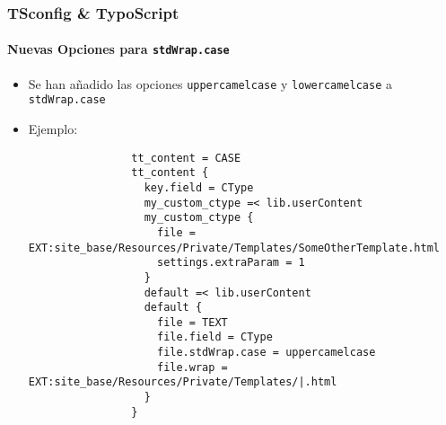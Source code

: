 
\begin{frame}[fragile]
	\frametitle{TSconfig \& TypoScript}
	\framesubtitle{Nuevas Opciones para \texttt{stdWrap.case}}

	\lstset{basicstyle=\tiny\ttfamily}

	\begin{itemize}

		\item Se han añadido las opciones \texttt{uppercamelcase} y \texttt{lowercamelcase}
			a \texttt{stdWrap.case}

		\item Ejemplo:

			\begin{lstlisting}
				tt_content = CASE
				tt_content {
				  key.field = CType
				  my_custom_ctype =< lib.userContent
				  my_custom_ctype {
				    file = EXT:site_base/Resources/Private/Templates/SomeOtherTemplate.html
				    settings.extraParam = 1
				  }
				  default =< lib.userContent
				  default {
				    file = TEXT
				    file.field = CType
				    file.stdWrap.case = uppercamelcase
				    file.wrap = EXT:site_base/Resources/Private/Templates/|.html
				  }
				}
			\end{lstlisting}

	\end{itemize}

\end{frame}


